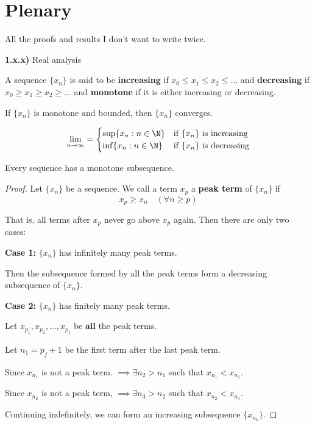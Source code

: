 
\section{Plenary}\label{80eeafc}

All the proofs and results I don't want to write twice.

\textbf{1.x.x)} Real analysis

\label{d5142a8}

A sequence $\{x_n\}$ is said to be \textbf{increasing} if $x_0\leq
	x_1\leq x_2\leq\ldots$ and \textbf{decreasing} if $x_0\geq x_1\geq
	x_2\geq\ldots$ and \textbf{monotone} if it is either increasing or
decreasing.

\label{ca25eb7}

If $\{x_n\}$ is monotone and bounded, then $\{x_n\}$ converges.

$$
\lim_{n\to\infty}=\begin{cases}
  \sup\{x_n:n\in\N\} & \text{if $\{x_n\}$ is increasing} \\
  \inf\{x_n:n\in\N\} & \text{if $\{x_n\}$ is decreasing}
\end{cases}
$$

\label{dddb70e}

Every sequence has a monotone subsequence.

\begin{proof}
	\def\xn{\{x_n\}}

	Let $\xn$ be a sequence. We call a term $x_p$ a \textbf{peak term}
	of $\xn$ if
	$$x_p\geq x_n\quad(\forall n\geq p)$$

  That is, all terms after $x_p$ never go above $x_p$ again. Then
  there are only two cases:

  \textbf{Case 1:} $\xn$ has infinitely many peak terms.

  Then the subsequence formed by all the peak terms form a decreasing
  subsequence of $\xn$.

  \textbf{Case 2:} $\xn$ has finitely many peak terms.

  Let $x_{p_1},x_{p_2},\ldots,x_{p_j}$ be \textbf{all} the peak terms.

  Let $n_1=p_j+1$ be the first term after the last peak term.

  Since $x_{n_1}$ is not a peak term. $\implies\exists n_2>n_1$ such
  that $x_{n_1}<x_{n_2}$.

  Since $x_{n_2}$ is not a peak term, $\implies\exists n_3>n_2$ such
  that $x_{n_2}<x_{n_3}$.

  Continuing indefinitely, we can form an increasing subsequence
  $\{x_{n_k}\}$.
\end{proof}

